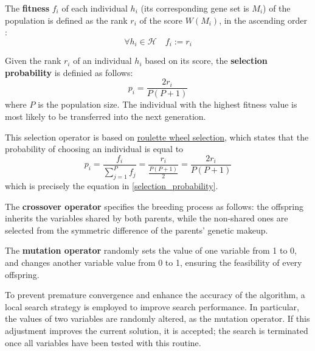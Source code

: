 \begin{definition}
    The \textbf{fitness} $f_i$ of each individual $h_i$ (its corresponding gene set is $M_i$) of the population is defined as the rank $r_i$ of the score $W(M_i)$, in the ascending order : $$\forall h_i \in \mathcal H \quad f_i := r_i$$
\end{definition}

\begin{definition} \label{selection_probability}
    Given the rank $r_i$ of an individual $h_i$ based on its score, the \textbf{selection probability} is definied as follows: $$p_i = \dfrac{2r_i}{P(P + 1)}$$ where $P$ is the population size. The individual with the highest fitness value is most likely to be transferred into the next generation.
\end{definition}

This selection operator is based on \href{https://en.wikipedia.org/wiki/Selection_(genetic_algorithm)#Roulette_wheel_selection}{roulette wheel selection}, which states that the probability of choosing an individual is equal to $$p_i = \dfrac{f_i}{\sum_{j = 1}^P {f_j}} = \dfrac{r_i}{\frac{P(P + 1)}{2}} = \dfrac{2r_i}{P(P+1)}$$ which is precisely the equation in \cref{selection_probability}.

\begin{definition}
    The \textbf{crossover operator} specifies the breeding process as follows: the offspring inherits the variables shared by both parents, while the non-shared ones are selected from the symmetric difference of the parents' genetic makeup.
\end{definition}

\begin{definition}
    The \textbf{mutation operator} randomly sets the value of one variable from 1 to 0, and changes another variable value from 0 to 1, ensuring the feasibility of every offspring.
\end{definition}

\begin{definition}
    To prevent premature convergence and enhance the accuracy of the algorithm, a local search strategy is employed to improve search performance. In particular, the values of two variables are randomly altered, as the mutation operator. If this adjustment improves the current solution, it is accepted; the search is terminated once all variables have been tested with this routine.
\end{definition}

